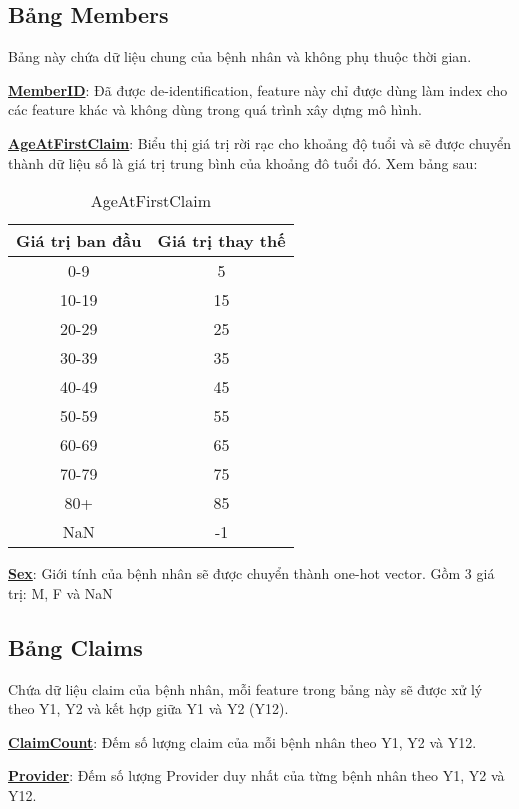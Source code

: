 \subsection{Bảng Members}

Bảng này chứa dữ liệu chung của bệnh nhân và không phụ thuộc thời gian.

\textbf{\underline{MemberID}}: Đã được de-identification, feature này chỉ được dùng làm index cho các feature khác và không dùng trong quá trình xây dựng mô hình.

\textbf{\underline{AgeAtFirstClaim}}: Biểu thị giá trị rời rạc cho khoảng độ tuổi và sẽ được chuyển thành dữ liệu số là giá trị trung bình của khoảng đô tuổi đó. Xem bảng sau:

\begin{table}[h!]
    \centering
    \begin{tabular}{||c c||} 
     \hline
     Giá trị ban đầu & Giá trị thay thế \\
     \hline\hline
     0-9 & 5 \\
     10-19 & 15 \\
     20-29 & 25 \\
     30-39 & 35 \\
     40-49 & 45 \\
     50-59 & 55 \\
     60-69 & 65 \\
     70-79 & 75 \\
     80+ & 85 \\
     NaN & -1 \\
     \hline
    \end{tabular}
    \caption{AgeAtFirstClaim}
    \label{table:1}
\end{table}

\textbf{\underline{Sex}}: Giới tính của bệnh nhân sẽ được chuyển thành one-hot vector. Gồm 3 giá trị: M, F và NaN

\subsection{Bảng Claims}

Chứa dữ liệu claim của bệnh nhân, mỗi feature trong bảng này sẽ được xử lý theo Y1, Y2 và kết hợp giữa Y1 và Y2 (Y12).

\textbf{\underline{ClaimCount}}: Đếm số lượng claim của mỗi bệnh nhân theo Y1, Y2 và Y12.

\textbf{\underline{Provider}}: Đếm số lượng Provider duy nhất của từng bệnh nhân theo Y1, Y2 và Y12.

